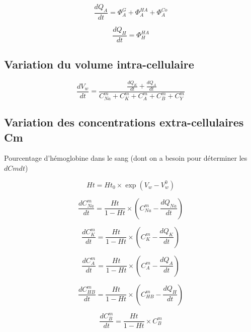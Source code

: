 \documentclass[a4paper,fleqn]{article}
\begin{document}
\begin{equation}
\frac{dQ_A}{dt}=\Phi_{A}^{G}+\Phi_{A}^{HA}+\Phi_{A}^{Co}
\end{equation}

\begin{equation}
\frac{dQ_H}{dt}=\Phi_{H}^{HA}
\end{equation}

\subsection{Variation du volume intra-cellulaire}

\begin{equation}
\frac{dV_w}{dt}   = \frac{\frac{dQ_K}{dt}+\frac{dQ_A}{dt}}{C_{Na}^{m}+C_{K}^{m}+C_{A}^{m}+C_{B}^{m}+C_{Y}^{m}}
\end{equation}

\subsection{Variation des concentrations extra-cellulaires Cm}

Pourcentage d'hémoglobine dans le sang (dont on a besoin pour déterminer les $dCmdt$)

\begin{equation}
Ht = {Ht_0}\times{\exp{(V_w-V_w^0)}}
\end{equation}

\begin{equation}
\frac{dC_{Na}^m}{dt}={\frac{Ht}{1 - Ht}}\times{\left(C_{Na}^m-\frac{dQ_{Na}}{dt}\right)}
\end{equation}

\begin{equation}
\frac{dC_{K}^m}{dt}={\frac{Ht}{1 - Ht}}\times{\left(C_{K}^m-\frac{dQ_{K}}{dt}\right)}
\end{equation}

\begin{equation}
\frac{dC_{A}^m}{dt}={\frac{Ht}{1 - Ht}}\times{\left(C_{A}^m-\frac{dQ_{A}}{dt}\right)}
\end{equation}

\begin{equation}
\frac{dC_{HB}^m}{dt}={\frac{Ht}{1 - Ht}}\times{\left(C_{HB}^m-\frac{dQ_{H}}{dt}\right)}
\end{equation}

\begin{equation}
\frac{dC_{B}^m}{dt}={\frac{Ht}{1 - Ht}}\times{C_{B}^m}
\end{equation}
\end{document}
